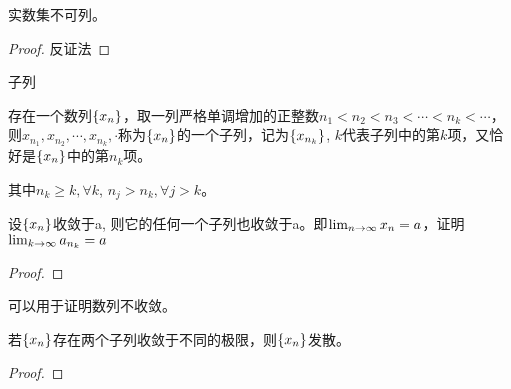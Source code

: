 \begin{theorem}
    实数集不可列。
\end{theorem}
\begin{proof}
    反证法
\end{proof}

子列
\begin{definition}
    存在一个数列$\left\{ x_n\right\}$，取一列严格单调增加的正整数$n_1 < n_2 < n_3 < \cdots < n_k < \cdots$，则$x_{n_1}, x_{n_2}, \cdots, x_{n_k}, \cdot$称为$\left\{ x_n\right\}$的一个子列，记为$\left\{ x_{n_k}\right\}$, $k$代表子列中的第$k$项，又恰好是$\left\{ x_n\right\}$中的第$n_k$项。
\end{definition}
其中$n_k \ge k, \forall k$, $n_j > n_k, \forall j > k$。
\begin{theorem}
    设$\left\{ x_n\right\}$收敛于a, 则它的任何一个子列也收敛于a。即$\lim_{n \to \infty } x_n = a$，证明$\lim_{k \to \infty } a_{n_k} = a$
\end{theorem}
\begin{proof}

\end{proof}
可以用于证明数列不收敛。
\begin{proposition}
    若$\left\{ x_n\right\}$存在两个子列收敛于不同的极限，则$\left\{ x_n\right\}$发散。
\end{proposition}
\begin{proof}

\end{proof}


